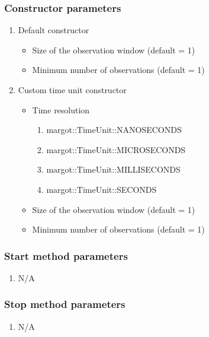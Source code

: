 \subsubsection*{Constructor parameters}
\begin{enumerate}
	\item Default constructor
		\begin{itemize}
			\item Size of the observation window (default = 1)
			\item Minimum number of observations (default = 1)
		\end{itemize}
	\item Custom time unit constructor
		\begin{itemize}
			\item Time resolution
				\begin{enumerate}
					\item margot::TimeUnit::NANOSECONDS
					\item margot::TimeUnit::MICROSECONDS
					\item margot::TimeUnit::MILLISECONDS
					\item margot::TimeUnit::SECONDS
				\end{enumerate}
			\item Size of the observation window (default = 1)
			\item Minimum number of observations (default = 1)
		\end{itemize}
\end{enumerate}

\subsubsection*{Start method parameters}
\begin{enumerate}
	\item[] N/A
\end{enumerate}


\subsubsection*{Stop method parameters}
\begin{enumerate}
	\item[] N/A
\end{enumerate}